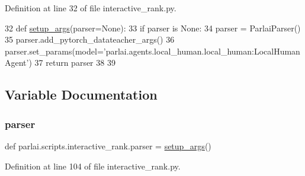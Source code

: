 Definition at line 32 of file interactive\+\_\+rank.\+py.


\begin{DoxyCode}
32 \textcolor{keyword}{def }\hyperlink{namespaceparlai_1_1scripts_1_1interactive__rank_af87c6b5d3f8843e51461c9cfd75fd510}{setup\_args}(parser=None):
33     \textcolor{keywordflow}{if} parser \textcolor{keywordflow}{is} \textcolor{keywordtype}{None}:
34         parser = ParlaiParser()
35     parser.add\_pytorch\_datateacher\_args()
36     parser.set\_params(model=\textcolor{stringliteral}{'parlai.agents.local\_human.local\_human:LocalHumanAgent'})
37     \textcolor{keywordflow}{return} parser
38 
39 
\end{DoxyCode}


\subsection{Variable Documentation}
\mbox{\label{namespaceparlai_1_1scripts_1_1interactive__rank_a68288547427936a867a1b8eb9a945be7}} 
\subsubsection{\texorpdfstring{parser}{parser}}
{\footnotesize\ttfamily def parlai.\+scripts.\+interactive\+\_\+rank.\+parser = \hyperlink{namespaceparlai_1_1scripts_1_1interactive__rank_af87c6b5d3f8843e51461c9cfd75fd510}{setup\+\_\+args}()}



Definition at line 104 of file interactive\+\_\+rank.\+py.

